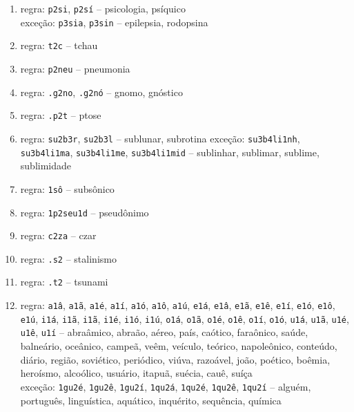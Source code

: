 \documentclass{article}
\begin{document}
\begin{enumerate}
\item regra: \texttt{p2si}, \texttt{p2sí} -- psicologia, psíquico\\
exceção: \texttt{p3sia}, \texttt{p3sin} -- epilepsia, rodopsina

\item regra: \texttt{t2c} -- tchau%

\item regra: \texttt{p2neu} -- pneumonia
    
\item regra: \texttt{.g2no}, \texttt{.g2nó} -- gnomo, gnóstico

\item regra: \texttt{.p2t} -- ptose%

\item regra: \texttt{su2b3r}, \texttt{su2b3l} -- sublunar, subrotina
exceção: \texttt{su3b4li1nh}, \texttt{su3b4li1ma}, \texttt{su3b4li1me}, \texttt{su3b4li1mid} -- sublinhar, sublimar, sublime, sublimidade

\item regra: \texttt{1sô} -- subsônico

\item regra: \texttt{1p2seu1d} -- pseudônimo

\item regra: \texttt{c2za} -- czar

\item regra: \texttt{.s2} -- stalinismo

\item regra: \texttt{.t2} -- tsunami

\item regra: \texttt{a1â}, \texttt{a1ã}, \texttt{a1é}, \texttt{a1í}, \texttt{a1ó}, \texttt{a1ô}, \texttt{a1ú}, \texttt{e1á}, \texttt{e1â}, \texttt{e1ã}, \texttt{e1ê}, \texttt{e1í}, \texttt{e1ó}, \texttt{e1ô}, \texttt{e1ú}, \texttt{i1á}, \texttt{i1ã}, \texttt{i1ã}, \texttt{i1é}, \texttt{i1ó}, \texttt{i1ú}, \texttt{o1á}, \texttt{o1ã}, \texttt{o1é}, \texttt{o1ê}, \texttt{o1í}, \texttt{o1ó}, \texttt{u1á}, \texttt{u1ã}, \texttt{u1é}, \texttt{u1ê}, \texttt{u1í} --  abraâmico, abraão, aéreo, país, caótico, faraônico, saúde, balneário, oceânico, campeã, veêm, veículo, teórico, napoleônico, conteúdo, diário, região, soviético, periódico, viúva, razoável, joão, poético, boêmia, heroísmo, alcoólico, usuário, itapuã, suécia, cauê, suíça \\
exceção: \texttt{1gu2é}, \texttt{1gu2ê}, \texttt{1gu2í}, \texttt{1qu2á}, \texttt{1qu2é}, \texttt{1qu2ê}, \texttt{1qu2í} -- alguém, português, linguística, aquático, inquérito, sequência, química


\end{enumerate}
\end{document}
